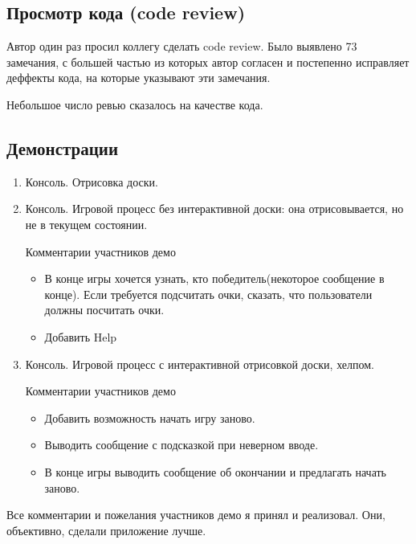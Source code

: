 \subsection*{Просмотр кода (code review)}

Автор один раз просил коллегу сделать code review. Было выявлено 73 замечания, с большей частью из которых автор согласен и постепенно исправляет деффекты кода, на которые указывают эти замечания.

Небольшое число ревью сказалось на качестве кода.

\subsection*{Демонстрации}

\begin{enumerate}

\item Консоль. Отрисовка доски.

\item Консоль. Игровой процесс без интерактивной доски: она отрисовывается, но не в текущем состоянии.

Комментарии участников демо

\begin{itemize}
	\item В конце игры хочется узнать, кто победитель(некоторое сообщение в конце). Если требуется подсчитать очки, сказать, что пользователи должны посчитать очки.
	\item Добавить Help
\end{itemize}

\item Консоль. Игровой процесс с интерактивной отрисовкой доски, хелпом.

Комментарии участников демо

\begin{itemize}
	\item Добавить возможность начать игру заново.
	\item Выводить сообщение с подсказкой при неверном вводе.
	\item В конце игры выводить сообщение об окончании и предлагать начать заново.
\end{itemize}

\end{enumerate}

Все комментарии и пожелания участников демо я принял и реализовал. Они, объективно, сделали приложение лучше.

